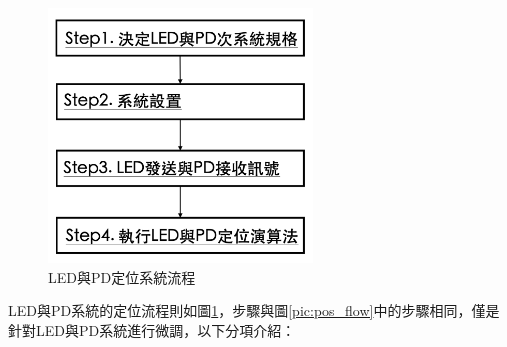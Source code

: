 \begin{figure}[htpb]
    \centering
    \includegraphics[width=7cm]{ch2pic/lp_system_flow.png}
    \caption{LED與PD定位系統流程}
    \label{pic:lp_system_flow}
\end{figure}

LED與PD系統的定位流程則如圖\ref{pic:lp_system_flow}，步驟與圖\ref{pic:pos_flow}中的步驟相同，僅是針對LED與PD系統進行微調，以下分項介紹：
    

